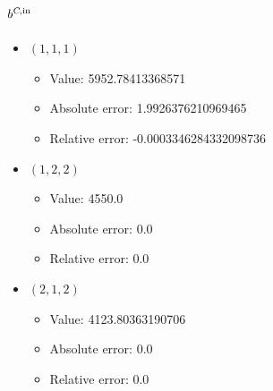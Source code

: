 \documentclass{article}%
\begin{document}
\subsection{$b^{\textsl{C},\text{in}}$}%
\begin{itemize}%
	\item $(1, 1, 1)$%
	\begin{itemize}%
		\item Value: 5952.78413368571%
		\item Absolute error: 1.9926376210969465%
		\item Relative error: -0.0003346284332098736%
	\end{itemize}%
	\item $(1, 2, 2)$%
	\begin{itemize}%
		\item Value: 4550.0%
		\item Absolute error: 0.0%
		\item Relative error: 0.0%
	\end{itemize}%
	\item $(2, 1, 2)$%
	\begin{itemize}%
		\item Value: 4123.80363190706%
		\item Absolute error: 0.0%
		\item Relative error: 0.0%
	\end{itemize}%
\end{itemize}%
\end{document}
